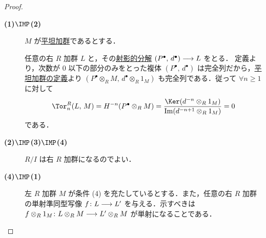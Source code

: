 \documentclass[algtopo_main]{subfiles}
\begin{document}
\begin{proof}
    \begin{description}
        \item[\textbf{(1)$\bm{\IMP}$(2)}] 
        $M$ が\hyperref[def:flat-mod]{平坦加群}であるとする．

        任意の右 $R$ 加群 $L$ と，その\hyperref[def:projective-resolution]{射影的分解} $(P^\bullet,\, d^\bullet) \longrightarrow L$ をとる．
        定義より，次数が $0$ 以下の部分のみをとった複体 $(P^\bullet,\, d^\bullet)$ は完全列だから，\hyperref[def:flat-mod]{平坦加群の定義}より
        $(P^\bullet \otimes_R M,\, d^\bullet \otimes_R 1_M)$ も完全列である．従って $\forall n \ge 1$ に対して
        \begin{align}
            \Tor^R_n (L,\, M) = H^{-n} (P^\bullet \otimes_R M) = \frac{\Ker (d^{-n} \otimes_R 1_M)}{\Im (d^{-n+1} \otimes_R 1_M)} = 0
        \end{align}
        である．
        \item[\textbf{(2)$\bm{\IMP}$(3)$\bm{\IMP}$(4)}] $R/I$ は右 $R$ 加群になるのでよい．
        \item[\textbf{(4)$\bm{\IMP}$(1)}] 左 $R$ 加群 $M$ が条件 (4) を充たしているとする．また，任意の右 $R$ 加群の単射準同型写像 $f \colon L \longrightarrow L'$ を与える．示すべきは
        $f \otimes_R 1_M \colon L \otimes_R M \longrightarrow L' \otimes_R M$ が単射になることである．


\end{description}
\end{proof}
\end{document}
